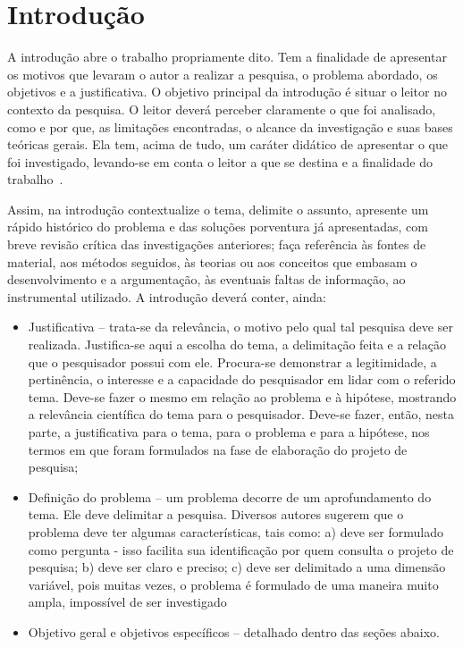 \chapter{Introdução}\label{cap:introducao}


A introdução abre o trabalho propriamente dito. Tem a finalidade de apresentar os motivos que levaram o autor a realizar a pesquisa, o problema abordado, os objetivos e a justificativa. O objetivo principal da introdução é situar o leitor no contexto da pesquisa. O leitor deverá perceber claramente o que foi analisado, como e por que, as limitações encontradas, o alcance da investigação e suas bases teóricas gerais. Ela tem, acima de tudo, um caráter didático de apresentar o que foi investigado, levando-se em conta o leitor a que se destina e a finalidade do trabalho~\cite{ifsc:manual:normalizacao}. 

Assim, na introdução contextualize o tema, delimite o assunto, apresente um rápido histórico do problema e das soluções porventura já apresentadas, com breve revisão crítica das investigações anteriores; faça referência às fontes de material, aos métodos seguidos, às teorias ou aos conceitos que embasam o desenvolvimento e a argumentação, às eventuais faltas de informação, ao instrumental utilizado. A introdução deverá conter, ainda:

\begin{itemize}
   \item Justificativa -- trata-se da relevância, o motivo pelo qual tal pesquisa deve ser realizada. Justifica-se aqui a escolha do tema, a delimitação feita e a relação que o pesquisador possui com ele. Procura-se demonstrar a legitimidade, a pertinência, o interesse e a capacidade do pesquisador em lidar com o referido tema. Deve-se fazer o mesmo em relação ao problema e à hipótese, mostrando a relevância científica do tema para o pesquisador. Deve-se fazer, então, nesta parte, a justificativa para o tema, para o problema e para a hipótese, nos termos em que foram formulados na fase de elaboração do projeto de pesquisa;
   
   \item Definição do problema -- um problema decorre de um aprofundamento do tema. Ele deve delimitar a pesquisa. Diversos autores sugerem que o problema deve ter algumas características, tais como: a) deve ser formulado como pergunta - isso facilita sua identificação por quem consulta o projeto de pesquisa; b) deve ser claro e preciso; c) deve ser delimitado a uma dimensão variável, pois muitas vezes, o problema é formulado de uma maneira muito ampla, impossível de ser investigado 
   
   \item Objetivo geral e objetivos específicos -- detalhado dentro das seções abaixo.
\end{itemize}

